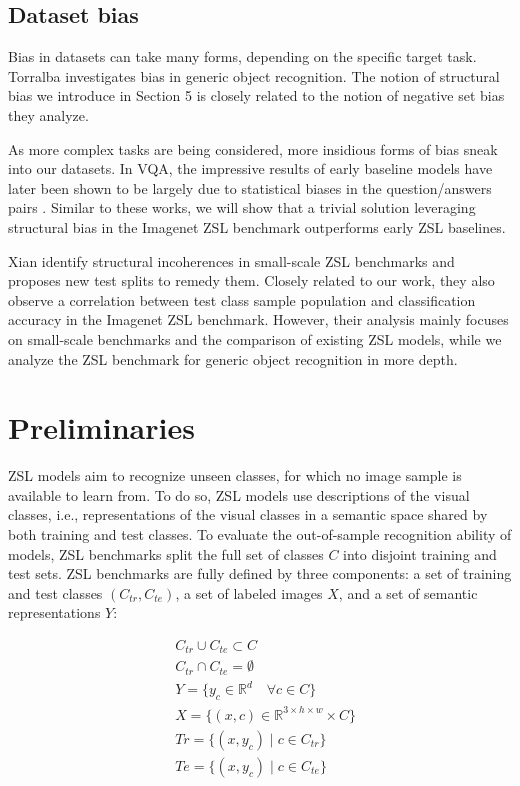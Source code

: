 \subsection{Dataset bias}

Bias in datasets can take many forms, depending on the specific target task.
Torralba \etal \cite{torralba2011unbiased} investigates bias in generic object recognition. 
The notion of structural bias we introduce in Section 5 is closely related to the notion of negative set bias they analyze.

As more complex tasks are being considered, more insidious forms of bias sneak into our datasets.
In VQA, the impressive results of early baseline models
have later been shown to be largely due to statistical biases in the question/answers pairs \cite{jabri2016revisiting,kafle2017analysis,johnson2017clevr}.
Similar to these works, we will show that a trivial solution leveraging structural bias in the Imagenet ZSL benchmark outperforms early ZSL baselines.

Xian \etal \cite{xian2017zero} identify structural incoherences in small-scale ZSL benchmarks and proposes new test splits to remedy them.
Closely related to our work, they also observe a correlation between test class sample population and classification accuracy in the Imagenet ZSL benchmark.
However, their analysis mainly focuses on small-scale benchmarks and the comparison of existing ZSL models, 
while we analyze the ZSL benchmark for generic object recognition in more depth.

\section{Preliminaries}

ZSL models aim to recognize unseen classes, for which no image sample is available to learn from. 
To do so, ZSL models use descriptions of the visual classes, i.e., representations of the visual classes in a semantic space shared by both training and test classes.
To evaluate the out-of-sample recognition ability of models, ZSL benchmarks split the full set of classes $C$ into disjoint training and test sets.
ZSL benchmarks are fully defined by three components:
a set of training and test classes $(C_{tr}, C_{te})$, 
a set of labeled images $X$, and a set of semantic representations $Y$:%

\begin{subequations} 
\begin{align}
& C_{tr} \cup C_{te} \subset C         \\
& C_{tr} \cap C_{te} = \emptyset       \\
& Y = \{y_c \in \mathbb{R}^d \quad \forall c \in C\} \\
& X = \{(x,c) \in \mathbb{R}^{3 \times h \times w} \times C\}   \\
& Tr = \{(x,y_c) \; | \; c \in C_{tr}\}  \\
& Te = \{(x,y_c) \; | \; c \in C_{te}\} 
\end{align}
\end{subequations} 

